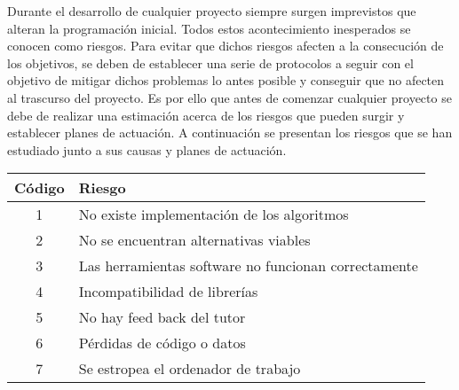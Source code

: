 Durante el desarrollo de cualquier proyecto siempre surgen imprevistos que alteran la programación inicial. Todos estos acontecimiento inesperados se conocen como riesgos. Para evitar que dichos riesgos afecten a la consecución de los objetivos, se deben de establecer una serie de protocolos a seguir con el objetivo de mitigar dichos problemas lo antes posible y conseguir que no afecten al trascurso del proyecto. Es por ello que antes de comenzar cualquier proyecto se debe de realizar una estimación acerca de los riesgos que pueden surgir y establecer planes de actuación. A continuación se presentan los riesgos que se han estudiado junto a sus causas y planes de actuación.


\begin{table}[h]
\centering
\begin{tabular}{|c|l|}
\hline
\rowcolor[HTML]{C0C0C0} 
{\color[HTML]{000000} \textbf{Código}} & {\color[HTML]{000000} \textbf{Riesgo}}                       \\ \hline
\rowcolor[HTML]{EFEFEF} 
{\color[HTML]{000000} 1} & {\color[HTML]{000000} No existe implementación de los algoritmos}           \\ \hline
\rowcolor[HTML]{EFEFEF} 
{\color[HTML]{000000} 2}               & {\color[HTML]{000000} No se encuentran alternativas viables} \\ \hline
\rowcolor[HTML]{EFEFEF} 
{\color[HTML]{000000} 3} & {\color[HTML]{000000} Las herramientas software no funcionan correctamente} \\ \hline
\rowcolor[HTML]{EFEFEF} 
{\color[HTML]{000000} 4}               & {\color[HTML]{000000} Incompatibilidad de librerías}         \\ \hline
\rowcolor[HTML]{EFEFEF} 
{\color[HTML]{000000} 5}               & {\color[HTML]{000000} No hay feed back del tutor}            \\ \hline
\rowcolor[HTML]{EFEFEF} 
{\color[HTML]{000000} 6}               & {\color[HTML]{000000} Pérdidas de código o datos}            \\ \hline
\rowcolor[HTML]{EFEFEF} 
{\color[HTML]{000000} 7}               & {\color[HTML]{000000} Se estropea el ordenador de trabajo}   \\ \hline
\end{tabular}
\end{table}

